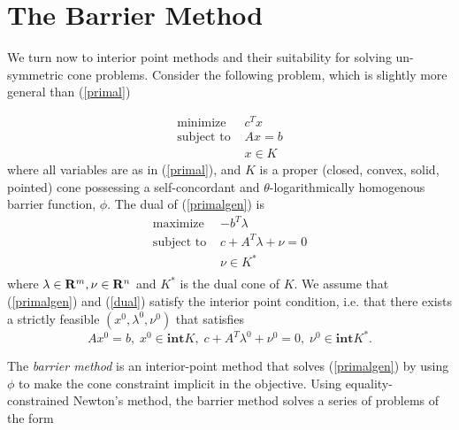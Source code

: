 \documentclass{article}
\begin{document}
\section{The Barrier Method}

We turn now to interior point methods and their suitability for
solving un-symmetric cone problems. Consider the following problem, which is slightly 
more general than (\ref{primal})

\begin{equation}\label{primalgen}
  \begin{array}{ll}
    \mbox{minimize}    & c^Tx \\
    \mbox{subject to } & Ax = b \\
                       & x \in K
  \end{array}
\end{equation}
where all variables are as in (\ref{primal}), and $K$ is a proper (closed, convex, solid, pointed) cone 
possessing a self-concordant and $\theta$-logarithmically homogenous barrier function, $\phi$. The
dual of (\ref{primalgen}) is
\begin{equation}\label{dual}
  \begin{array}{ll}
    \mbox{maximize}    & -b^T\lambda \\
    \mbox{subject to } & c + A^T\lambda + \nu = 0 \\
                       & \nu \in K^* \\
  \end{array}
\end{equation}
where $\lambda\in \mathbf{R}^m, \nu \in \mathbf{R}^n$ and $K^*$ is the dual cone of $K$. We assume
that (\ref{primalgen}) and (\ref{dual}) satisfy the interior point condition, i.e. that there
exists a strictly feasible $(x^0,\lambda^0,\nu^0)$ that satisfies
\[
 Ax^0=b,\; x^0 \in \mathbf{int} K, \; c+ A^T\lambda^0 + \nu^0 = 0,\; \nu^0 \in \mathbf{int} K^*.
\]

The \emph{barrier method} is an interior-point method that solves (\ref{primalgen}) by using
$\phi$ to make the cone constraint implicit in the objective. Using equality-constrained
Newton's method, the barrier method solves a series of problems of the form
\end{document}
